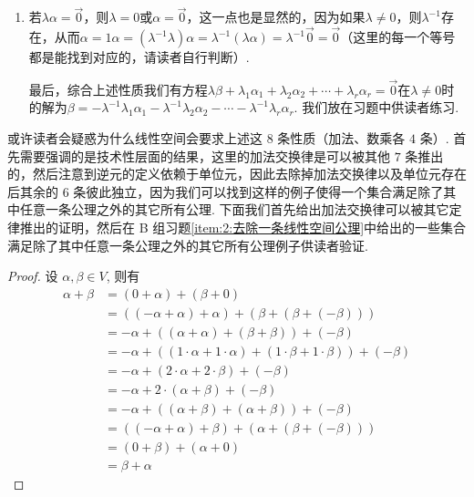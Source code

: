 \begin{enumerate}
\begin{enumerate}
              \item 若$\lambda\alpha=\vec{0}$，则$\lambda=0$或$\alpha=\vec{0}$，这一点也是显然的，因为如果$\lambda\neq 0$，则$\lambda^{-1}$存在，从而$\alpha=1\alpha=(\lambda^{-1}\lambda)\alpha=\lambda^{-1}(\lambda\alpha)=\lambda^{-1}\vec{0}=\vec{0}$（这里的每一个等号都是能找到对应的，请读者自行判断）.

                    最后，综合上述性质我们有方程$\lambda\beta+\lambda_1\alpha_1+\lambda_2\alpha_2+\cdots+\lambda_r\alpha_r=\vec{0}$在$\lambda\neq 0$时的解为$\beta=-\lambda^{-1}\lambda_1\alpha_1-\lambda^{-1}\lambda_2\alpha_2-\cdots-\lambda^{-1}\lambda_r\alpha_r$. 我们放在习题中供读者练习.
          \end{enumerate}
\end{enumerate}

或许读者会疑惑为什么线性空间会要求上述这 $8$ 条性质（加法、数乘各 $4$ 条）. 首先需要强调的是技术性层面的结果，这里的加法交换律是可以被其他 $7$ 条推出的，然后注意到逆元的定义依赖于单位元，因此去除掉加法交换律以及单位元存在后其余的 $6$ 条彼此独立，因为我们可以找到这样的例子使得一个集合满足除了其中任意一条公理之外的其它所有公理. 下面我们首先给出加法交换律可以被其它定律推出的证明，然后在 B 组习题\ref{item:2:去除一条线性空间公理}中给出的一些集合满足除了其中任意一条公理之外的其它所有公理例子供读者验证.

\begin{proof}
{
    \allowdisplaybreaks
    设 $\alpha,\beta\in V$, 则有
    \begin{align*}
        \tag{加法单位元}
        \alpha + \beta &= (0 + \alpha) + (\beta + 0)\\
        \tag{逆元}
        &= ((-\alpha + \alpha) + \alpha) + (\beta + (\beta + (-\beta)))\\
        \tag{加法结合律}
        &= -\alpha + ((\alpha + \alpha) + (\beta + \beta)) + (-\beta)\\
        \tag{乘法单位元}
        &= -\alpha + ((1\cdot\alpha + 1\cdot\alpha) + (1\cdot\beta + 1\cdot\beta)) + (-\beta)\\
        \tag{左分配律}
        &= -\alpha + (2\cdot\alpha + 2\cdot\beta) + (-\beta)\\
        \tag{右分配律}
        &= -\alpha + 2\cdot (\alpha + \beta) + (-\beta)\\
        \tag{左分配律}
        &= -\alpha + ((\alpha + \beta) + (\alpha + \beta)) + (-\beta)\\
        \tag{加法结合律}
        &= ((-\alpha + \alpha) + \beta) + (\alpha + (\beta + (-\beta)))\\
        \tag{逆元}
        &= (0 + \beta) + (\alpha + 0)\\
        \tag{加法单位元}
        &= \beta + \alpha
    \end{align*}
}
\end{proof}

